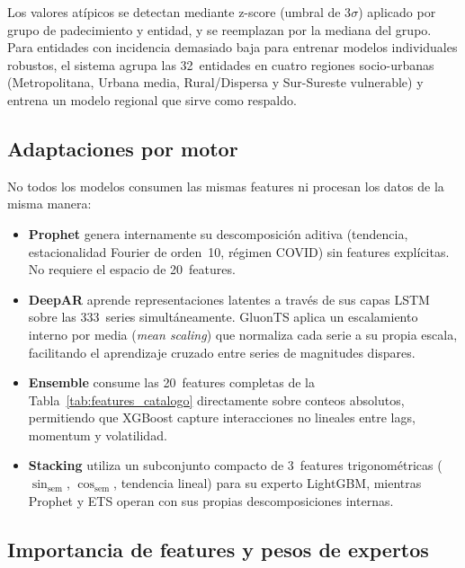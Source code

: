 \documentclass[12pt, letterpaper]{article}
\begin{document}
Los valores atípicos se detectan mediante z-score (umbral de 3$\sigma$) aplicado por grupo de padecimiento y entidad, y se reemplazan por la mediana del grupo. Para entidades con incidencia demasiado baja para entrenar modelos individuales robustos, el sistema agrupa las 32~entidades en cuatro regiones socio-urbanas (Metropolitana, Urbana media, Rural/Dispersa y Sur-Sureste vulnerable) y entrena un modelo regional que sirve como respaldo.

\subsection{Adaptaciones por motor}

No todos los modelos consumen las mismas features ni procesan los datos de la misma manera:

\begin{itemize}
  \item \textbf{Prophet} genera internamente su descomposición aditiva (tendencia, estacionalidad Fourier de orden~10, régimen COVID) sin features explícitas. No requiere el espacio de 20~features.
  \item \textbf{DeepAR} aprende representaciones latentes a través de sus capas LSTM sobre las 333~series simultáneamente. GluonTS aplica un escalamiento interno por media (\textit{mean scaling}) que normaliza cada serie a su propia escala, facilitando el aprendizaje cruzado entre series de magnitudes dispares.
  \item \textbf{Ensemble} consume las 20~features completas de la Tabla~\ref{tab:features_catalogo} directamente sobre conteos absolutos, permitiendo que XGBoost capture interacciones no lineales entre lags, momentum y volatilidad.
  \item \textbf{Stacking} utiliza un subconjunto compacto de 3~features trigonométricas ($\sin_{\text{sem}}$, $\cos_{\text{sem}}$, tendencia lineal) para su experto LightGBM, mientras Prophet y ETS operan con sus propias descomposiciones internas.
\end{itemize}

\subsection{Importancia de features y pesos de expertos}
\end{document}
